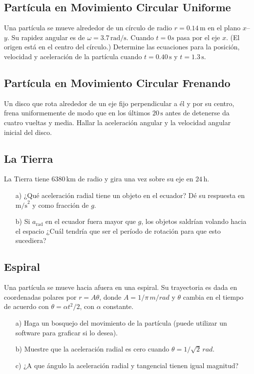 \documentclass{replab}
\begin{document}
\subsection{Partícula en Movimiento Circular Uniforme}
Una partícula se mueve alrededor de un círculo de radio $r = 0.14\,\text{m}$ en el plano $x$–$y$. Su rapidez angular es de $\omega = 3.7\,\text{rad/s}$. Cuando $t = 0s$ pasa por el eje $x$. (El origen está en el centro del círculo.) Determine las ecuaciones para la posición, velocidad y aceleración de la partícula cuando $t = 0.40\,\text{s}$ y $t = 1.3\,\text{s}$.

\subsection{Partícula en Movimiento Circular Frenando}
Un disco que rota alrededor de un eje fijo perpendicular a él y por su centro, frena uniformemente de modo que en los últimos $20\,\text{s}$ antes de detenerse da cuatro vueltas y media. Hallar la aceleración angular y la velocidad angular inicial del disco.

\subsection{La Tierra}
La Tierra tiene $6380\,\text{km}$ de radio y gira una vez sobre su eje en $24\,\text{h}$.

\begin{enumerate}
	\item[a)] ¿Qué aceleración radial tiene un objeto en el ecuador? Dé su respuesta en $\text{m/s}^2$ y como fracción de $g$.

	\item[b)] Si $a_{\text{rad}}$ en el ecuador fuera mayor que $g$, los objetos saldrían volando hacia el espacio ¿Cuál tendría que ser el período de rotación para que esto sucediera?
\end{enumerate}

\subsection{Espiral}
Una partícula se mueve hacia afuera en una espiral. Su trayectoria es dada en coordenadas polares por $r=A\theta$, donde $A=1/\pi\, m/rad$ y $\theta$ cambia en el tiempo de acuerdo con $\theta = \alpha t^2/2$, con $\alpha$ constante.

\begin{enumerate}
	\item [a)] Haga un bosquejo del movimiento de la partícula (puede utilizar un software para graficar si lo desea).
	\item [b)] Muestre que la aceleración radial es cero cuando $\theta=1/\sqrt{2} \, rad$.
	\item [c)] ¿A que ángulo la aceleración radial y tangencial tienen igual magnitud?
\end{enumerate}
\end{document}
